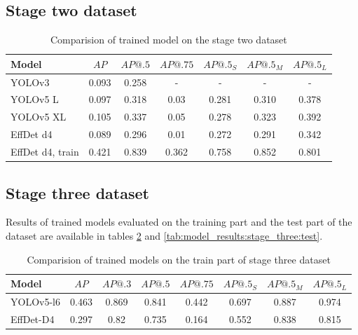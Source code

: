 \subsection{Stage two dataset}

\begin{table}[H]
    \centering
    \begin{tabular}{|l|c|c|c|c|c|c|}
        \hline
        Model            & $AP$  & $AP@.5$ & $AP@.75$ & $AP@.5_S$ & $AP@.5_M$ & $AP@.5_L$ \\ \hline
        YOLOv3           & 0.093 & 0.258   & -        & -         & -         & -         \\ \hline
        YOLOv5 L         & 0.097 & 0.318   & 0.03     & 0.281     & 0.310     & 0.378     \\ \hline
        YOLOv5 XL        & 0.105 & 0.337   & 0.05     & 0.278     & 0.323     & 0.392     \\ \hline
        EffDet d4        & 0.089 & 0.296   & 0.01     & 0.272     & 0.291     & 0.342     \\ \hline
        EffDet d4, train & 0.421 & 0.839   & 0.362    & 0.758     & 0.852     & 0.801     \\ \hline
    \end{tabular}
    \caption{Comparision of trained model on the stage two dataset}
    \label{tab:model_results:stage_two}
\end{table}

\subsection{Stage three dataset}
Results of trained models evaluated on the training part and the test part of the dataset are available in tables \ref{tab:model_results:stage_three:train} and \ref{tab:model_results:stage_three:test}.

\begin{table}[H]
    \centering
    \begin{tabular}{|l|c|c|c|c|c|c|c|}
        \hline
        Model     & $AP$  & $AP@.3$ & $AP@.5$ & $AP@.75$ & $AP@.5_S$ & $AP@.5_M$ & $AP@.5_L$ \\ \hline
        YOLOv5-l6 & 0.463 & 0.869   & 0.841   & 0.442    & 0.697     & 0.887     & 0.974     \\ \hline
        EffDet-D4 & 0.297 & 0.82    & 0.735   & 0.164    & 0.552     & 0.838     & 0.815     \\ \hline
    \end{tabular}
    \caption{Comparision of trained models on the train part of stage three dataset}
    \label{tab:model_results:stage_three:train}
\end{table}


